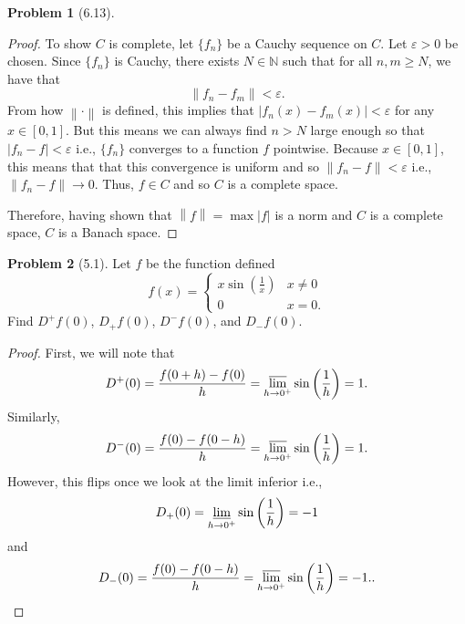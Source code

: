 \documentclass[12pt]{article}
\newcommand{\N}{\mathbb{N}}
\renewcommand{\epsilon}{\varepsilon}
\newcommand{\abs}[1]{
    \left\lvert #1 \right\rvert
}
\newcommand{\norm}[1]{
    \left\lVert #1 \right\rVert
}
\theoremstyle{definition}
\newtheorem{problem}{Problem}
\begin{document}
\begin{problem}[6.13]
\begin{proof}
            To show \( C \) is complete, let \( \{f_n\} \) be a Cauchy sequence on \( C \).
            Let \( \epsilon > 0 \) be chosen.
            Since \( \{f_n\} \) is Cauchy, there exists \( N \in \N \) such that for all \( n,m \geq N \), we have that 
                \[
                    \norm{f_n - f_m} < \epsilon.  
                \]
            From how \( \norm{\cdot} \) is defined, this implies that \( |f_n(x) - f_m(x)| < \epsilon \) for any \( x \in [0,1] \). 
            But this means we can always find \( n > N \) large enough so that \( |f_n - f| < \epsilon \) i.e., \( \{f_n\} \) converges to a function \( f \) pointwise. 
            Because \( x \in [0,1] \), this means that that this convergence is uniform and so \( \norm{f_n  - f} < \epsilon \) i.e., \( \norm{f_n - f} \to 0 \). Thus, \( f \in C \) and so \( C \) is a complete space.

            Therefore, having shown that \( \norm{f} = \max \abs{f} \) is a norm and \( C \) is a complete space, \( C \) is a Banach space.
        \end{proof}
    
\end{problem}


\begin{problem}[5.1]

    Let \( f \) be the function defined 
        \[
            f(x) = \begin{cases}
                x \sin \left( \frac{1}{x}\right) & x \neq 0 \\
                0 & x = 0.
            \end{cases}  
        \]
    Find \( D^+f(0)\), \( D_+f(0)\), \( D^-f(0)\), and \( D_-f(0)\).

            \begin{proof}
                First, we will note that 
                    \begin{align*}
                        D^+(0) =  \frac{f(0 + h) - f(0)}{h} = \varlimsup_{h \to 0^+} \sin \left( \frac{1}{h}\right) = 1.
                    \end{align*}
                Similarly,
                    \[
                        D^-(0) =  \frac{f(0) - f(0 - h)}{h} = \varlimsup_{h \to 0^+} \sin \left( \frac{1}{h}\right) = 1.
                    \]
                However, this flips once we look at the limit inferior i.e.,
                    \begin{align*}
                        D_+(0) = \varliminf_{h \to 0^+} \sin \left( \frac{1}{h}\right) = -1
                    \end{align*}
                and
                    \[
                        D_-(0) =  \frac{f(0) - f(0 - h)}{h} = \varlimsup_{h \to 0^+} \sin \left( \frac{1}{h}\right) = -1..
                    \]
            \end{proof}


\end{problem}
\end{document}
